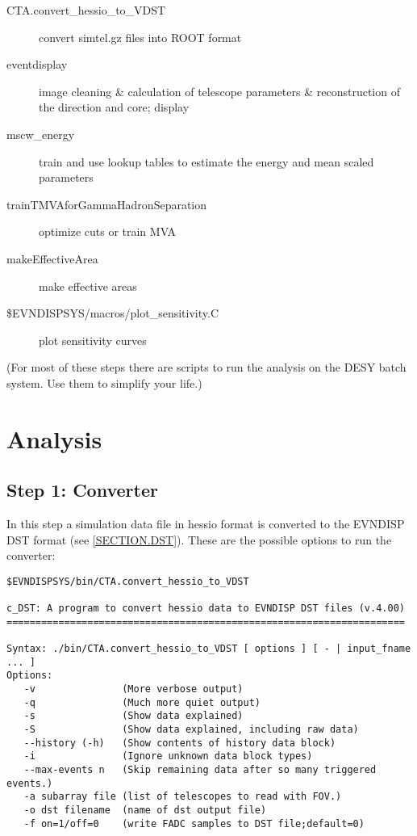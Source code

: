 \documentclass[titlepage,a4paper,twoside,11pt]{report}
\begin{document}
\begin{description}
\item[CTA.convert\_hessio\_to\_VDST]
        convert simtel.gz files into ROOT format

\item[eventdisplay]
	image cleaning \& calculation of telescope parameters \& reconstruction of the direction and core; display

\item[mscw\_energy]
        train and use lookup tables to estimate the energy and mean scaled parameters
        
\item[trainTMVAforGammaHadronSeparation]
        optimize cuts or train MVA

\item[makeEffectiveArea]
        make effective areas

\item[\$EVNDISPSYS/macros/plot\_sensitivity.C]
        plot sensitivity curves
\end{description}

(For most of these steps there are scripts to run the analysis on the DESY batch system. Use them to simplify your life.)

\section{Analysis}

\subsection{Step 1: Converter}

In this step a simulation data file in hessio format is converted to the EVNDISP DST format 
(see \ref{SECTION.DST}). These are the possible options to run the converter:

\begin{lstlisting}
$EVNDISPSYS/bin/CTA.convert_hessio_to_VDST

c_DST: A program to convert hessio data to EVNDISP DST files (v.4.00)
=====================================================================

Syntax: ./bin/CTA.convert_hessio_to_VDST [ options ] [ - | input_fname ... ]
Options:
   -v               (More verbose output)
   -q               (Much more quiet output)
   -s               (Show data explained)
   -S               (Show data explained, including raw data)
   --history (-h)   (Show contents of history data block)
   -i               (Ignore unknown data block types)
   --max-events n   (Skip remaining data after so many triggered events.)
   -a subarray file (list of telescopes to read with FOV.)
   -o dst filename  (name of dst output file)
   -f on=1/off=0    (write FADC samples to DST file;default=0)
\end{lstlisting}
\end{document}
